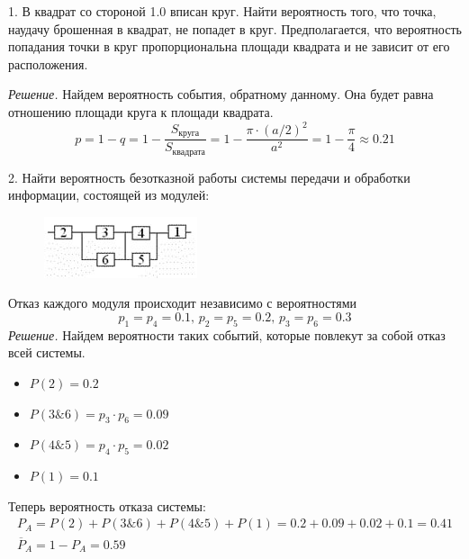 \documentclass[a4paper,12pt]{article}
\begin{document}
    
    1. В квадрат со стороной 1.0 вписан круг. Найти вероятность того, что точка, наудачу
    брошенная в квадрат, не попадет в круг. Предполагается, что вероятность попадания
    точки в круг пропорциональна площади квадрата и не зависит от его расположения.

    \textit{Решение.} Найдем вероятность события, обратному данному. Она будет равна
    отношению площади круга к площади квадрата.
    \begin{equation*}
        p = 1 - q = 1 - \frac{S_\text{круга}}{S_\text{квадрата}} = 1 - \frac{\pi \cdot (a/2)^2}{a^2} =
        1 - \frac{\pi}{4} \approx 0.21
    \end{equation*}

    \vspace{1cm}

    2. Найти вероятность безотказной работы системы передачи и обработки информации, состоящей из модулей:
    \begin{figure}[H]
        \centering
        \includegraphics[width=0.3\linewidth]{polytech/stats/homework-1/subfiles/images/scheme}
    \end{figure}
    Отказ каждого модуля происходит независимо с вероятностями
    \[
    p_1 = p_4 = 0.1, \, p_2 = p_5 = 0.2, \, p_3 = p_6 = 0.3    
    \]
    \textit{Решение.} Найдем вероятности таких событий, которые повлекут за собой отказ всей системы.
    \begin{itemize}
        \item $\displaystyle P(2) = 0.2$
        \item $\displaystyle P(3\&6) = p_3 \cdot p_6 = 0.09$
        \item $\displaystyle P(4\&5) = p_4 \cdot p_5 = 0.02$
        \item $\displaystyle P(1) = 0.1$
    \end{itemize}
    Теперь вероятность отказа системы:
    \begin{gather*}
        P_A = P(2) + P(3\&6) + P(4\&5) + P(1) = 0.2 + 0.09 + 0.02 + 0.1 = 0.41 \\
        \overline{P}_A = 1 - P_A = 0.59
    \end{gather*}
\end{document}
